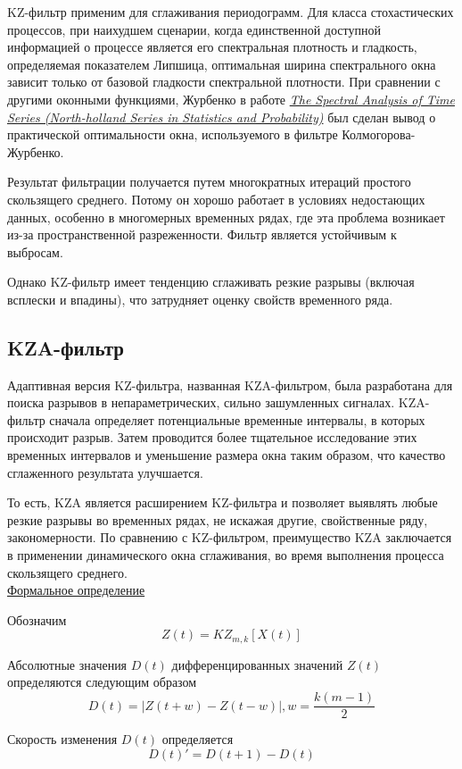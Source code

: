 KZ-фильтр применим для сглаживания периодограмм. Для класса стохастических процессов, при наихудшем сценарии, когда единственной доступной информацией о процессе является его спектральная плотность и гладкость, определяемая показателем Липшица, оптимальная ширина спектрального окна зависит только от базовой гладкости спектральной плотности. При сравнении с другими оконными функциями, Журбенко в работе \hyperlink{first}{\textit{The Spectral Analysis of Time Series (North-holland Series in Statistics and Probability)}} был сделан вывод о практической оптимальности окна, используемого в фильтре Колмогорова-Журбенко.

Результат фильтрации получается путем многократных итераций простого скользящего среднего. Потому он хорошо работает в условиях недостающих данных, особенно в многомерных временных рядах, где эта проблема возникает из-за пространственной разреженности. Фильтр является устойчивым к выбросам.

Однако KZ-фильтр имеет тенденцию сглаживать резкие разрывы (включая всплески и впадины), что затрудняет оценку свойств временного ряда.

\subsection*{KZA-фильтр}

Адаптивная версия KZ-фильтра, названная KZA-фильтром, была разработана для поиска разрывов в непараметрических, сильно зашумленных сигналах. KZA-фильтр сначала определяет потенциальные временные интервалы, в которых происходит разрыв. Затем проводится более тщательное исследование этих временных интервалов и уменьшение размера окна таким образом, что качество сглаженного результата улучшается.

То есть, KZA является расширением KZ-фильтра и позволяет выявлять любые резкие разрывы во временных рядах, не искажая другие, свойственные ряду, закономерности. По сравнению с KZ-фильтром, преимущество KZA заключается в применении динамического окна сглаживания, во время выполнения процесса скользящего среднего.
\\
\underline{Формальное определение}

Обозначим
$$
Z(t)=KZ_{m,k}[X(t)]
$$

Абсолютные значения $D(t)$ дифференцированных значений $Z(t)$ определяются следующим образом
$$
D(t)=|Z(t+w)-Z(t-w)|, w=\frac{k(m-1)}{2}
$$

Скорость изменения $D(t)$ определяется
$$
D(t)'=D(t+1)-D(t)
$$

